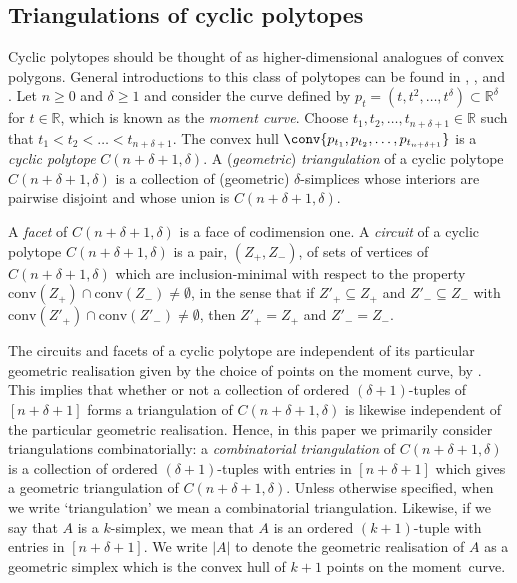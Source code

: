 \subsection{Triangulations of cyclic polytopes}\label{sect:back:cyc}

Cyclic polytopes should be thought of as higher-dimensional analogues of convex polygons. General introductions to this class of polytopes can be found in \cite[Lecture 0]{ziegler}, \cite[4.7]{gruenbaum}, \cite[Section 6.1]{lrs} and \cite[Chapter VI]{bar}. Let $n \geqslant 0$ and $\delta \geqslant 1$ and consider the curve defined by $p_{t}=(t, t^{2}, \dots , t^{\delta}) \subset \mathbb{R}^{\delta}$ for $t \in \mathbb{R}$, which is known as the \emph{moment curve}. Choose $t_{1}, t_{2}, \dots , t_{n + \delta + 1} \in \mathbb{R}$ such that $t_{1} < t_{2} < \dots < t_{n + \delta + 1}$. The convex hull $\conv\{ p_{t_{1}}, p_{t_{2}}, \dots , p_{t_{n + \delta + 1}} \}$ is a \emph{cyclic polytope} $C(n + \delta + 1, \delta)$. A (\emph{geometric}) \emph{triangulation} of a cyclic polytope $C(n + \delta + 1, \delta)$ is a collection of (geometric) $\delta$-simplices whose interiors are pairwise disjoint and whose union is $C(n + \delta + 1, \delta)$.

A \emph{facet} of $C(n + \delta + 1, \delta)$ is a face of codimension one. A \emph{circuit} of a cyclic polytope $C(n + \delta + 1, \delta)$ is a pair, $(Z_{+}, Z_{-})$, of sets of vertices of $C(n + \delta + 1,\delta)$ which are inclusion-minimal with respect to the property $\mathrm{conv}(Z_{+}) \cap \mathrm{conv}(Z_{-}) \neq \emptyset$, in the sense that if $Z'_{+} \subseteq Z_{+}$ and $Z'_{-} \subseteq Z_{-}$ with $\mathrm{conv}(Z'_{+}) \cap \mathrm{conv}(Z'_{-}) \neq \emptyset$, then $Z'_{+} = Z_{+}$ and $Z'_{-} = Z_{-}$.

The circuits and facets of a cyclic polytope are independent of its particular geometric realisation given by the choice of points on the moment curve, by \cite{gale,breen}. This implies that whether or not a collection of ordered $(\delta + 1)$-tuples of $[n + \delta + 1]$ forms a triangulation of $C(n + \delta + 1, \delta)$ is likewise independent of the particular geometric realisation. Hence, in this paper we primarily consider triangulations combinatorially: a \emph{combinatorial triangulation} of $C(n + \delta + 1, \delta)$ is a collection of ordered $(\delta + 1)$-tuples with entries in $[n + \delta + 1]$ which gives a geometric triangulation of $C(n + \delta + 1, \delta)$. Unless otherwise specified, when we write `triangulation' we mean a combinatorial triangulation. Likewise, if we say that $A$ is a $k$-simplex, we mean that $A$ is an ordered $(k + 1)$-tuple with entries in $[n + \delta + 1]$. We write $|A|$ to denote the geometric realisation of $A$ as a geometric simplex which is the convex hull of $k + 1$ points on the moment~curve. 


